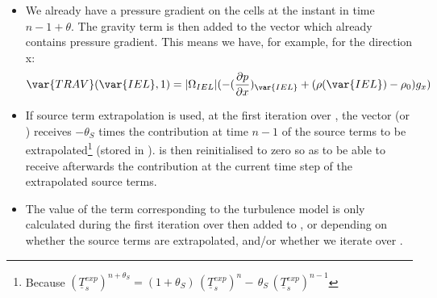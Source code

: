 \begin{itemize}
\item We already have a pressure gradient on the cells at the instant in time $n-1+\theta$. The gravity term is then added to the vector  which already contains pressure gradient. This means we have, for example, for the direction x:
\begin{equation}
\var{TRAV}(\var{IEL},1) = |\Omega_{IEL}| (-\displaystyle (\frac {\partial p}
{\partial x})_{\var{IEL}}+(\rho(\var{IEL})-\rho_0)g_x)
\end{equation}

\item If source term extrapolation is used, at the first iteration over , the vector  (or ) receives $-\theta_S$ times the contribution at time $n-1$ of the source terms to be extrapolated\footnote{Because
$(\underline{T}_s^{exp})^{n+\theta_S}=(1+\theta_S)\,(\underline{T}_s^{exp})^n
-\,\theta_S\, (\underline{T}_s^{exp})^{n-1}$} (stored in ).  is then reinitialised to zero so as to be able to receive afterwards the contribution at the current time step of the extrapolated source terms.

\item The value of the term corresponding to the turbulence model is only calculated during the first iteration over  then added to ,  or  depending on whether the source terms are extrapolated, and/or whether we iterate over .\\


\end{itemize}
